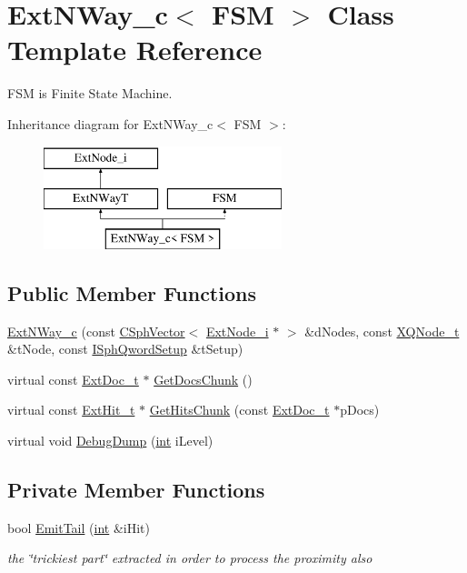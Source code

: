 \hypertarget{classExtNWay__c}{\section{Ext\-N\-Way\-\_\-c$<$ F\-S\-M $>$ Class Template Reference}
\label{classExtNWay__c}
}


F\-S\-M is Finite State Machine.  


Inheritance diagram for Ext\-N\-Way\-\_\-c$<$ F\-S\-M $>$\-:\begin{figure}[H]
\begin{center}
\leavevmode
\includegraphics[height=3.000000cm]{classExtNWay__c}
\end{center}
\end{figure}
\subsection*{Public Member Functions}
\begin{DoxyCompactItemize}
\item 
\hyperlink{classExtNWay__c_a1c3411894663fde5570267cb1d7fa3ed}{Ext\-N\-Way\-\_\-c} (const \hyperlink{classCSphVector}{C\-Sph\-Vector}$<$ \hyperlink{classExtNode__i}{Ext\-Node\-\_\-i} $\ast$ $>$ \&d\-Nodes, const \hyperlink{structXQNode__t}{X\-Q\-Node\-\_\-t} \&t\-Node, const \hyperlink{classISphQwordSetup}{I\-Sph\-Qword\-Setup} \&t\-Setup)
\item 
virtual const \hyperlink{structExtDoc__t}{Ext\-Doc\-\_\-t} $\ast$ \hyperlink{classExtNWay__c_a98d330fea6897c1baaee15f8b9c663bc}{Get\-Docs\-Chunk} ()
\item 
virtual const \hyperlink{structExtHit__t}{Ext\-Hit\-\_\-t} $\ast$ \hyperlink{classExtNWay__c_af356acf3b5a3688227e55f1b9fe012f9}{Get\-Hits\-Chunk} (const \hyperlink{structExtDoc__t}{Ext\-Doc\-\_\-t} $\ast$p\-Docs)
\item 
virtual void \hyperlink{classExtNWay__c_aa483971ad72b022afa242d1c255a2f43}{Debug\-Dump} (\hyperlink{sphinxexpr_8cpp_a4a26e8f9cb8b736e0c4cbf4d16de985e}{int} i\-Level)
\end{DoxyCompactItemize}
\subsection*{Private Member Functions}
\begin{DoxyCompactItemize}
\item 
bool \hyperlink{classExtNWay__c_aba8f6475fd08c8ac6a1e1186236827d4}{Emit\-Tail} (\hyperlink{sphinxexpr_8cpp_a4a26e8f9cb8b736e0c4cbf4d16de985e}{int} \&i\-Hit)
\begin{DoxyCompactList}\small\item\em the \char`\"{}trickiest part\char`\"{} extracted in order to process the proximity also \end{DoxyCompactList}\end{DoxyCompactItemize}
